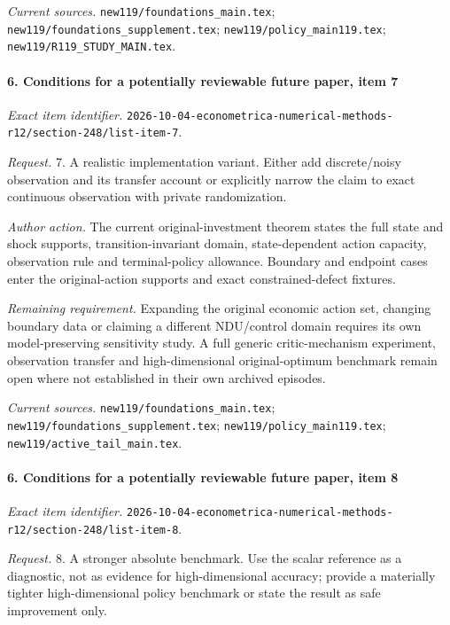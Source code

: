\par\emph{Current sources.} \nolinkurl{new119/foundations_main.tex}; \nolinkurl{new119/foundations_supplement.tex}; \nolinkurl{new119/policy_main119.tex}; \nolinkurl{new119/R119_STUDY_MAIN.tex}.

\paragraph{6. Conditions for a potentially reviewable future paper, item 7}

\emph{Exact item identifier.} \nolinkurl{2026-10-04-econometrica-numerical-methods-r12/section-248/list-item-7}.

\par\emph{Request.} 7. A realistic implementation variant. Either add discrete/\allowbreak{}noisy observation and its transfer account or explicitly narrow the claim to exact continuous observation with private randomization.

\par\emph{Author action.} The current original-investment theorem states the full state and shock supports, transition-invariant domain, state-dependent action capacity, observation rule and terminal-policy allowance. Boundary and endpoint cases enter the original-action supports and exact constrained-defect fixtures.

\par\emph{Remaining requirement.} Expanding the original economic action set, changing boundary data or claiming a different NDU/\allowbreak{}control domain requires its own model-preserving sensitivity study. A full generic critic-mechanism experiment, observation transfer and high-dimensional original-optimum benchmark remain open where not established in their own archived episodes.

\par\emph{Current sources.} \nolinkurl{new119/foundations_main.tex}; \nolinkurl{new119/foundations_supplement.tex}; \nolinkurl{new119/policy_main119.tex}; \nolinkurl{new119/active_tail_main.tex}.

\paragraph{6. Conditions for a potentially reviewable future paper, item 8}

\emph{Exact item identifier.} \nolinkurl{2026-10-04-econometrica-numerical-methods-r12/section-248/list-item-8}.

\par\emph{Request.} 8. A stronger absolute benchmark. Use the scalar reference as a diagnostic, not as evidence for high-dimensional accuracy; provide a materially tighter high-dimensional policy benchmark or state the result as safe improvement only.

